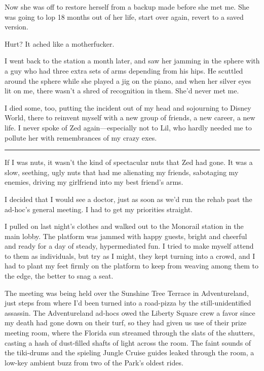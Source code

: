 Now she was off to restore herself from a backup made before she
met me. She was going to lop 18 months out of her life, start over
again, revert to a saved version.

Hurt? It ached like a motherfucker.

I went back to the station a month later, and saw her jamming in
the sphere with a guy who had three extra sets of arms depending
from his hips. He scuttled around the sphere while she played a jig
on the piano, and when her silver eyes lit on me, there wasn't a
shred of recognition in them. She'd never met me.

I died some, too, putting the incident out of my head and
sojourning to Disney World, there to reinvent myself with a new
group of friends, a new career, a new life. I never spoke of Zed
again—especially not to Lil, who hardly needed me to pollute her
with remembrances of my crazy exes.

\begin{center}\rule{3in}{0.4pt}\end{center}

If I was nuts, it wasn't the kind of spectacular nuts that Zed had
gone. It was a slow, seething, ugly nuts that had me alienating my
friends, sabotaging my enemies, driving my girlfriend into my best
friend's arms.

I decided that I would see a doctor, just as soon as we'd run the
rehab past the ad-hoc's general meeting. I had to get my priorities
straight.

I pulled on last night's clothes and walked out to the Monorail
station in the main lobby. The platform was jammed with happy
guests, bright and cheerful and ready for a day of steady,
hypermediated fun. I tried to make myself attend to them as
individuals, but try as I might, they kept turning into a crowd,
and I had to plant my feet firmly on the platform to keep from
weaving among them to the edge, the better to snag a seat.

The meeting was being held over the Sunshine Tree Terrace in
Adventureland, just steps from where I'd been turned into a
road-pizza by the still-unidentified assassin. The Adventureland
ad-hocs owed the Liberty Square crew a favor since my death had
gone down on their turf, so they had given us use of their prize
meeting room, where the Florida sun streamed through the slats of
the shutters, casting a hash of dust-filled shafts of light across
the room. The faint sounds of the tiki-drums and the spieling
Jungle Cruise guides leaked through the room, a low-key ambient
buzz from two of the Park's oldest rides.

